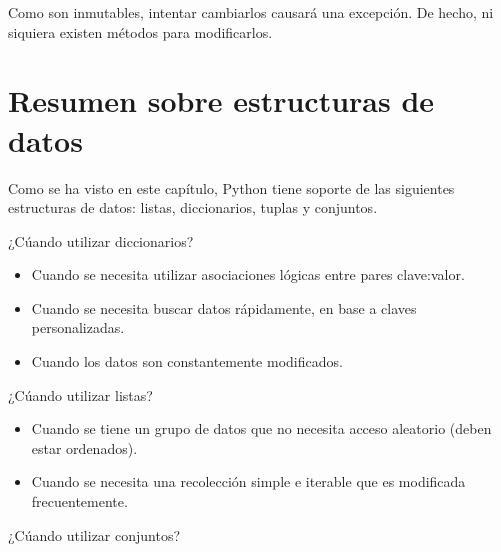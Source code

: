 
Como son inmutables, intentar cambiarlos causará una excepción.
De hecho, ni siquiera existen métodos para modificarlos.





\section{Resumen sobre estructuras de datos}

Como se ha visto en este capítulo, Python tiene soporte de las siguientes estructuras de datos: listas, diccionarios, tuplas y conjuntos.
\medskip

¿Cúando utilizar diccionarios?

\begin{itemize}
  \item Cuando se necesita utilizar asociaciones lógicas entre pares clave:valor.
  
  \item Cuando se necesita buscar datos rápidamente, en base a claves personalizadas.
  
  \item Cuando los datos son constantemente modificados.
  
\end{itemize}

¿Cúando utilizar listas?

\begin{itemize}
  \item Cuando se tiene un grupo de datos que no necesita acceso aleatorio (deben estar ordenados).
  
  \item Cuando se necesita una recolección simple e iterable que es modificada frecuentemente.
  
\end{itemize}

¿Cúando utilizar conjuntos?

